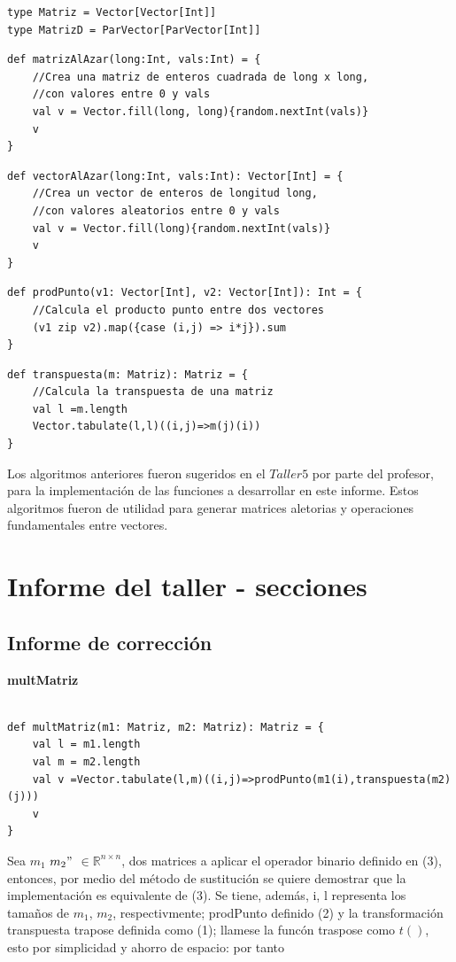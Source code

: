 \documentclass[12pt, a4paper]{article}
\begin{document}
\begin{lstlisting}[caption=Definiciones tipos de datos, label=lst:scala_code1]
type Matriz = Vector[Vector[Int]]
type MatrizD = ParVector[ParVector[Int]]
\end{lstlisting}
\begin{lstlisting}[caption=matriz al azar, label=lst:scala_code2]
def matrizAlAzar(long:Int, vals:Int) = {
    //Crea una matriz de enteros cuadrada de long x long,
    //con valores entre 0 y vals
    val v = Vector.fill(long, long){random.nextInt(vals)}
    v
}
\end{lstlisting}
\begin{lstlisting}[caption=vector al azar, label=lst:scala_code3]
def vectorAlAzar(long:Int, vals:Int): Vector[Int] = {
    //Crea un vector de enteros de longitud long,
    //con valores aleatorios entre 0 y vals
    val v = Vector.fill(long){random.nextInt(vals)}
    v
}
\end{lstlisting}
\begin{lstlisting}[caption=producto punto, label=lst:scala_code4]
def prodPunto(v1: Vector[Int], v2: Vector[Int]): Int = {
    //Calcula el producto punto entre dos vectores
    (v1 zip v2).map({case (i,j) => i*j}).sum
}
\end{lstlisting}
\begin{lstlisting}[caption=transpuesta de una matriz, label=lst:scala_code5]
def transpuesta(m: Matriz): Matriz = {
    //Calcula la transpuesta de una matriz
    val l =m.length
    Vector.tabulate(l,l)((i,j)=>m(j)(i))
}
\end{lstlisting}

Los algoritmos anteriores fueron sugeridos en el $Taller 5$ por parte del profesor, para la implementación de las funciones a desarrollar en este informe. Estos algoritmos fueron de utilidad para generar matrices aletorias y operaciones fundamentales entre vectores.

\section{Informe del taller - secciones}
\subsection{Informe de corrección}
\textbf{{multMatriz}} \\ \\
\begin{lstlisting}[caption=mult matriz, label=lst:scala_code6]
def multMatriz(m1: Matriz, m2: Matriz): Matriz = {
    val l = m1.length
    val m = m2.length
    val v =Vector.tabulate(l,m)((i,j)=>prodPunto(m1(i),transpuesta(m2)(j)))
    v
}
\end{lstlisting}
Sea $m_1$ $m_2"$ $\in \mathbb{R}^{n \times n}$, dos matrices a aplicar el operador binario definido en (3), entonces,
por medio del método de sustitución se quiere demostrar que la implementación es equivalente de (3). Se tiene, además,
i, l representa los tamaños de $m_1$, $m_2$, respectivmente; prodPunto definido (2) y la transformación transpuesta trapose definida como (1); llamese la funcón traspose como $t()$, esto por simplicidad y ahorro de espacio: por tanto
    
\end{document}
